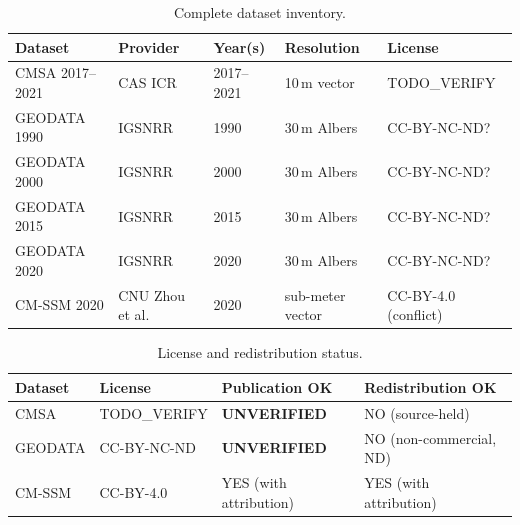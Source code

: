 \documentclass[11pt]{article}
\begin{document}
\begin{table}[htpb]
\centering
\caption{\label{tab:data_inv}Complete dataset inventory.}
\begin{tabular}{l l l l l}
\toprule
Dataset & Provider & Year(s) & Resolution & License \\
\midrule
CMSA 2017--2021 & CAS ICR & 2017--2021 & 10\,m vector & TODO\_VERIFY \\
GEODATA 1990 & IGSNRR & 1990 & 30\,m Albers & CC-BY-NC-ND? \\
GEODATA 2000 & IGSNRR & 2000 & 30\,m Albers & CC-BY-NC-ND? \\
GEODATA 2015 & IGSNRR & 2015 & 30\,m Albers & CC-BY-NC-ND? \\
GEODATA 2020 & IGSNRR & 2020 & 30\,m Albers & CC-BY-NC-ND? \\
CM-SSM 2020 & CNU Zhou et al. & 2020 & sub-meter vector & CC-BY-4.0 (conflict) \\
\bottomrule
\end{tabular}
\end{table}

\begin{table}[htpb]
\centering
\caption{\label{tab:licenses}License and redistribution status.}
\begin{tabular}{l l l l}
\toprule
Dataset & License & Publication OK & Redistribution OK \\
\midrule
CMSA & TODO\_VERIFY & \textbf{UNVERIFIED} & NO (source-held) \\
GEODATA & CC-BY-NC-ND & \textbf{UNVERIFIED} & NO (non-commercial, ND) \\
CM-SSM & CC-BY-4.0 & YES (with attribution) & YES (with attribution) \\
\bottomrule
\end{tabular}
\end{table}

\end{document}
